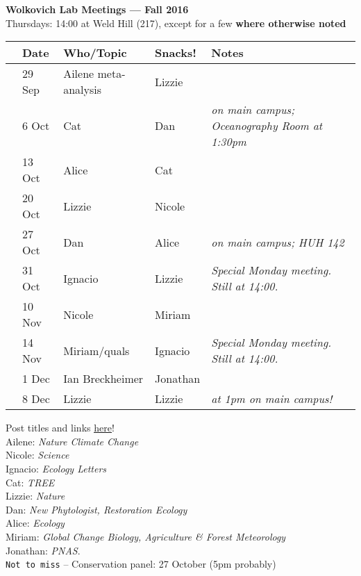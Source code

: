 \documentclass[11pt]{article}
\begin{document}
 
\raggedright
{}

\begin{center} 
{\large \textbf{Wolkovich Lab Meetings --- Fall 2016}} \\ [2pt]
Thursdays: 14:00 at Weld Hill (217), except for a few {\bf where otherwise noted}\\
\end{center} 

\begin{center}
\begin{tabular}{ p{0.2 cm}  p{2 cm}  p{5 cm}  p{2 cm}  p{4 cm} }  \hline \hline
 & \textbf{Date}
   & \textbf{Who/Topic}
      & \textbf{Snacks!} 
         & \textbf{Notes} \\ 
\hline \hline
 & 29 Sep & Ailene meta-analysis & Lizzie       & \\\hline
 & 6 Oct  & Cat & Dan &   \emph{on main campus; Oceanography Room at 1:30pm} \\\hline
 & 13 Oct & Alice & Cat     &  \\\hline
 & 20 Oct & Lizzie &  Nicole  &  \\\hline 
& 27 Oct & Dan & Alice    &  \emph{on main campus; HUH 142}  \\\hline
 & 31 Oct & Ignacio & Lizzie & \emph{Special Monday meeting. Still at 14:00.}\\\hline
 & 10 Nov & Nicole & Miriam &  \\\hline
 & 14 Nov & Miriam/quals & Ignacio &  \emph{Special Monday meeting. Still at 14:00.} \\\hline
 & 1 Dec & Ian Breckheimer &   Jonathan  &  \\\hline %

 & 8 Dec & Lizzie &   Lizzie & \emph{at 1pm on main campus!}   \\\hline  
\hline
\end{tabular}
\end{center}
\vspace{6pt}
 Post titles and links \href{https://docs.google.com/document/d/1j0WdDbjdp8ERLSO7whvtnP-tOblYMlX33TSCXy_uRKo/edit?usp=sharing}{\underline{here}}!\\
Ailene: \emph{Nature Climate Change}\\
Nicole: \emph{Science}\\
 Ignacio: \emph{Ecology Letters}\\
Cat: \emph{TREE}\\
 Lizzie: \emph{Nature}\\
Dan: \emph{New Phytologist, Restoration Ecology}\\
Alice: \emph{Ecology}\\
Miriam: \emph{Global Change Biology, Agriculture \& Forest Meteorology}\\
Jonathan: \emph{PNAS}.\\

\vspace{6pt}
\verb|Not to miss| -- Conservation panel: 27 October (5pm probably) \\

\vspace{2ex}
\end{document}
